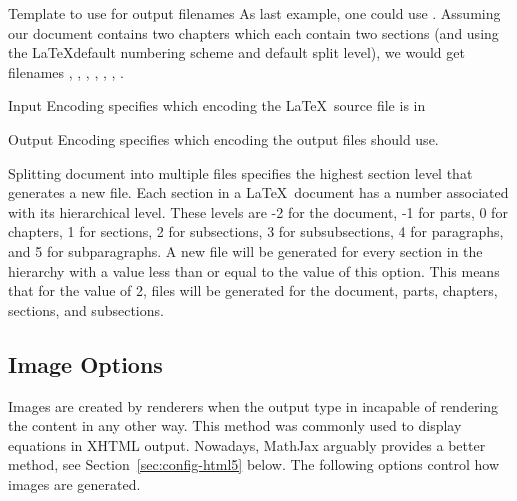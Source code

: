 \begin{configuration}{Template to use for output filenames}
As last example, one could use .
Assuming our document contains two chapters which each contain two
sections (and using the \LaTeX default numbering scheme and default
\plasTeX split level), we would get filenames
, , ,
, , ,
.

\end{configuration}

\begin{configuration}{Input Encoding}
specifies which encoding the \LaTeX\ source file is in
\end{configuration}

\begin{configuration}{Output Encoding}
specifies which encoding the output files should use.
\end{configuration}

\begin{configuration}{Splitting document into multiple files}
specifies the highest section level that generates a new file.  Each section
in a \LaTeX\ document has a number associated with its hierarchical level.
These levels are -2 for the document, -1 for parts, 0 for chapters,
1 for sections, 2 for subsections, 3 for subsubsections, 4 for paragraphs,
and 5 for subparagraphs.  A new file will be generated for every section
in the hierarchy with a value less than or equal to the value of this
option.  This means that for the value of 2, files will be generated for
the document, parts, chapters, sections, and subsections.
\end{configuration}


\subsection{Image Options\label{sec:config-images}}

Images are created by renderers when the output type in incapable of
rendering the content in any other way. This method was commonly used
to display equations in XHTML output. Nowadays, MathJax arguably
provides a better method, see Section~\ref{sec:config-html5} below.
The following options control how images are generated.

